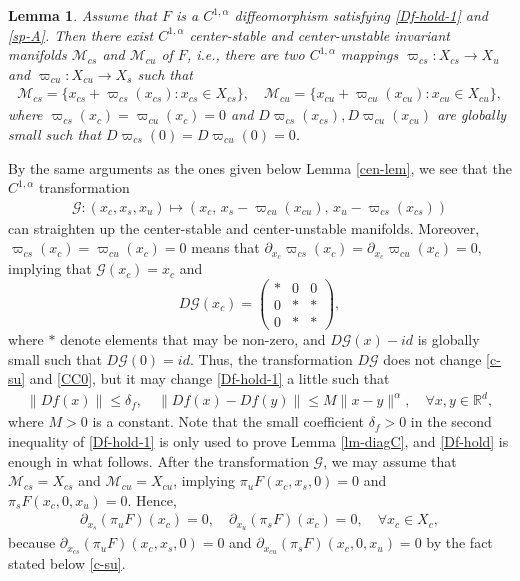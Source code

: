 \documentclass[reqno]{amsart}
\numberwithin{equation}{section}
\newtheorem{lemma}[theorem]{Lemma}
\begin{document}
\begin{lemma}\label{IM}
Assume that $F$ is a $C^{1,\alpha}$  diffeomorphism
 satisfying \eqref{Df-hold-1} and \eqref{sp-A}.
Then there exist $C^{1,\alpha}$  center-stable and center-unstable invariant manifolds
$\mathcal{M}_{cs}$ and $\mathcal{M}_{cu}$ of $F$, i.e., there are two $C^{1,\alpha}$ mappings $\varpi_{cs} :X_{cs}\to X_u$ and $\varpi_{cu}:X_{cu}\to X_s$ such that
\begin{align*}
 \mathcal{M}_{cs} =\{x_{cs}+\varpi_{cs}(x_{cs}):x_{cs}\in X_{cs}\},
\quad \mathcal{M}_{cu} =\{x_{cu}+\varpi_{cu}(x_{cu}):x_{cu}\in X_{cu}\},
\end{align*}
where $\varpi_{cs}(x_c)=\varpi_{cu}(x_c)=0$ and $D\varpi_{cs}(x_{cs}), D\varpi_{cu}(x_{cu})$ are globally small such that $D\varpi_{cs}(0)=D\varpi_{cu}(0)=0$.
\end{lemma}
\noindent
By the same arguments as the ones given below Lemma \ref{cen-lem}, we see that the $C^{1,\alpha}$ transformation
\begin{align}\label{GGG}
\mathcal{G}: (x_c,x_s,x_u) \mapsto (x_c, \,x_s-\varpi_{cu}(x_{cu}), \,x_u-\varpi_{cs}(x_{cs}))
\end{align}
can straighten up the center-stable and center-unstable manifolds. Moreover, $\varpi_{cs}(x_c)=\varpi_{cu}(x_c)=0$ means that 
$
\partial_{x_c}\varpi_{cs}(x_c)=\partial_{x_c}\varpi_{cu}(x_c)=0,
$
implying that $\mathcal{G}(x_c)=x_c$
and 
$$
D{\mathcal G}(x_c)=\left(
\begin{array}{ccc}
*& 0& 0
\\
0& *&*
\\
0& *&*
\end{array}
\right),
$$
where $*$ denote elements that may be non-zero,
and $D{\mathcal G}(x)-id$ is globally small such that $D{\mathcal G}(0)=id$. Thus, the transformation $D{\mathcal G}$ does not change \eqref{c-su} and \eqref{CC0}, but it may change \eqref{Df-hold-1} a little such that
\begin{align}\label{Df-hold}
 \|Df(x)\| \le \delta_f, \quad   
 \|D  f(x)-D  f(y)\| \le M \|x-y\|^\alpha,\quad \forall x,y\in\mathbb{R}^d,
\end{align}
where $M>0$ is a constant. Note that the small coefficient $\delta_f>0$ in the second inequality of \eqref{Df-hold-1} is only used to prove Lemma \ref{lm-diagC}, and \eqref{Df-hold} is enough in what follows. After the transformation ${\mathcal G}$, we may assume that 
$\mathcal{M}_{cs}=X_{cs}$ and $\mathcal{M}_{cu}=X_{cu}$,
implying
$
\pi_uF(x_c,x_s,0)=0
$
and
$
\pi_sF(x_c,0,x_u)=0.
$
Hence,
\begin{align}\label{s-u-u-s}
\partial_{x_s}(\pi_uF)(x_c)=0,\quad \partial_{x_u}(\pi_sF)(x_c)=0, \quad
\forall x_c\in X_c,
\end{align}
because $\partial_{x_{cs}}(\pi_uF)(x_c,x_s,0)=0$ and $\partial_{x_{cu}}(\pi_sF)(x_c,0,x_u)=0$
by the fact stated below \eqref{c-su}.
\end{document}
